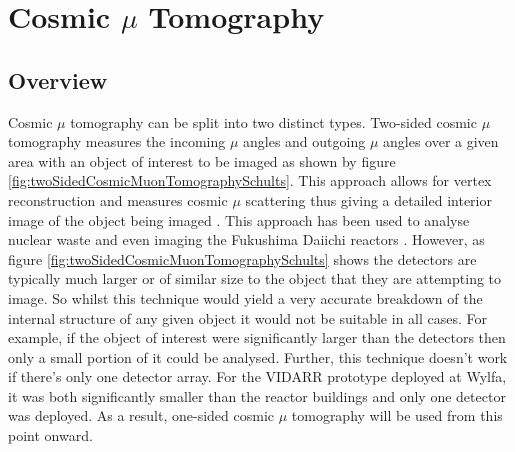 
\chapter{Cosmic $\mu$ Tomography}\label{chp:cosmicMuonTomography}

\ifpdf
    \graphicspath{{Chapter5/Figs/Raster/}{Chapter5/Figs/PDF/}{Chapter5/Figs/}}
\else
    \graphicspath{{Chapter5/Figs/Vector/}{Chapter5/Figs/}}
\fi

\section{Overview}\label{sec:cosMuOverview}
Cosmic $\mu$ tomography can be split into two distinct types. Two-sided cosmic $\mu$ tomography measures the incoming $\mu$ angles and outgoing $\mu$ angles over a given area with an object of interest to be imaged as shown by figure \ref{fig:twoSidedCosmicMuonTomographySchults}. This approach allows for vertex reconstruction and measures cosmic $\mu$ scattering thus giving a detailed interior image of the object being imaged \cite{schultz_2007}. This approach has been used to analyse nuclear waste \cite{jonkmans2013nuclear} and even imaging the Fukushima Daiichi reactors \cite{miyadera2013imaging}. However, as figure \ref{fig:twoSidedCosmicMuonTomographySchults} shows the  detectors are typically much larger or of similar size to the object that they are attempting to image. So whilst this technique would yield a very accurate breakdown of the internal structure of any given object it would not be suitable in all cases. For example, if the object of interest were significantly larger than the detectors then only a small portion of it could be analysed. Further, this technique doesn't work if there's only one detector array. For the VIDARR prototype deployed at Wylfa, it was both significantly smaller than the reactor buildings and only one detector was deployed. As a result, one-sided cosmic $\mu$ tomography will be used from this point onward. 

